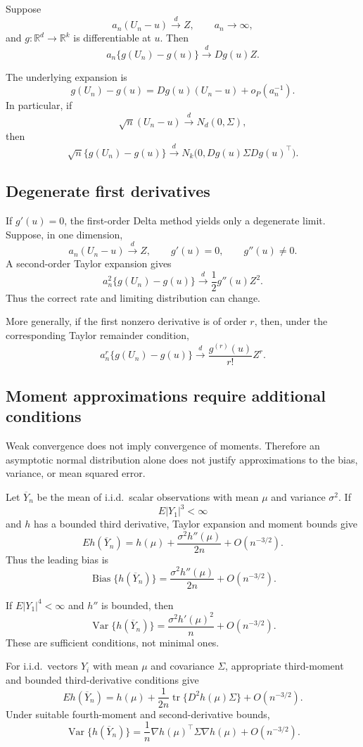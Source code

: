 Suppose
\[
a_n(U_n-u)\xrightarrow{d}Z,
\qquad a_n\to\infty,
\]
and $g:\mathbb R^d\to\mathbb R^k$ is differentiable at $u$.
Then
\[
a_n\{g(U_n)-g(u)\}\xrightarrow{d}Dg(u)Z.
\]

The underlying expansion is
\[
g(U_n)-g(u)
=
Dg(u)(U_n-u)+o_P(a_n^{-1}).
\]
In particular, if
\[
\sqrt n(U_n-u)\xrightarrow{d}N_d(0,\Sigma),
\]
then
\[
\sqrt n\{g(U_n)-g(u)\}
\xrightarrow{d}
N_k\bigl(0,Dg(u)\Sigma Dg(u)^\top\bigr).
\]

\subsection{Degenerate first derivatives}

If $g'(u)=0$, the first-order Delta method yields only a degenerate
limit. Suppose, in one dimension,
\[
a_n(U_n-u)\xrightarrow{d}Z,
\qquad
g'(u)=0,
\qquad
g''(u)\neq0.
\]
A second-order Taylor expansion gives
\[
a_n^2\{g(U_n)-g(u)\}
\xrightarrow{d}\frac12g''(u)Z^2.
\]
Thus the correct rate and limiting distribution can change.

More generally, if the first nonzero derivative is of order $r$,
then, under the corresponding Taylor remainder condition,
\[
a_n^r\{g(U_n)-g(u)\}
\xrightarrow{d}
\frac{g^{(r)}(u)}{r!}Z^r.
\]

\subsection{Moment approximations require additional conditions}

Weak convergence does not imply convergence of moments.
Therefore an asymptotic normal distribution alone does not justify
approximations to the bias, variance, or mean squared error.

Let $\overline Y_n$ be the mean of i.i.d.\ scalar observations with
mean $\mu$ and variance $\sigma^2$. If
\[
E|Y_1|^3<\infty
\]
and $h$ has a bounded third derivative, Taylor expansion and moment
bounds give
\[
Eh(\overline Y_n)
=
h(\mu)+\frac{\sigma^2h''(\mu)}{2n}
+O(n^{-3/2}).
\]
Thus the leading bias is
\[
\operatorname{Bias}\{h(\overline Y_n)\}
=
\frac{\sigma^2h''(\mu)}{2n}+O(n^{-3/2}).
\]

If $E|Y_1|^4<\infty$ and $h''$ is bounded, then
\[
\operatorname{Var}\{h(\overline Y_n)\}
=
\frac{\sigma^2h'(\mu)^2}{n}
+O(n^{-3/2}).
\]
These are sufficient conditions, not minimal ones.

For i.i.d.\ vectors $Y_i$ with mean $\mu$ and covariance $\Sigma$,
appropriate third-moment and bounded third-derivative conditions
give
\[
Eh(\overline Y_n)
=
h(\mu)+
\frac1{2n}\operatorname{tr}\{D^2h(\mu)\Sigma\}
+O(n^{-3/2}).
\]
Under suitable fourth-moment and second-derivative bounds,
\[
\operatorname{Var}\{h(\overline Y_n)\}
=
\frac1n\nabla h(\mu)^\top\Sigma\nabla h(\mu)
+O(n^{-3/2}).
\]


